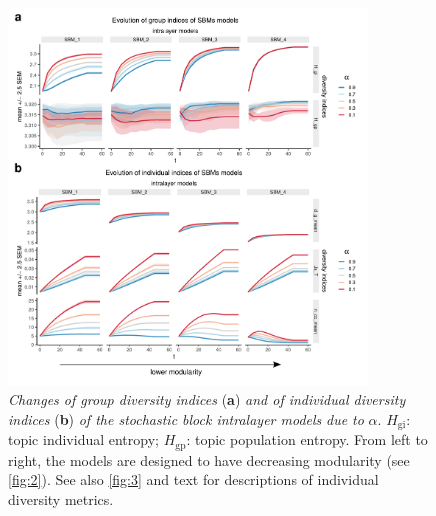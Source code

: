 \begin{figure}[H]
    \centering
    \includegraphics[width=0.85\textwidth,center]{../figures/report/Fig5.pdf}
    \caption{\label{fig:5}
    \textit{Changes of group diversity indices} (\textbf{a}) \textit{and of individual diversity indices} (\textbf{b}) \textit{of the stochastic block intralayer models} \textit{due to} $\alpha$. $H_{\mathrm{gi}}$: topic individual entropy; $H_{\mathrm{gp}}$: topic population entropy. From left to right, the models are designed to have decreasing modularity (see \autoref{fig:2}). See also \autoref{fig:3} and text for descriptions of individual diversity metrics.
    }
\end{figure}